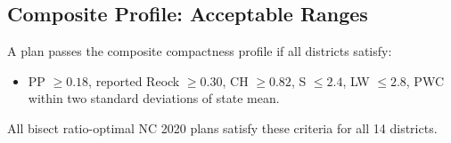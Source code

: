 \subsection{Composite Profile: Acceptable Ranges}

A plan passes the composite compactness profile if all districts satisfy:
\begin{itemize}
  \item PP $\geq 0.18$, reported Reock $\geq 0.30$, CH $\geq 0.82$,
    S $\leq 2.4$, LW $\leq 2.8$, PWC within two standard deviations of state mean.
\end{itemize}
All bisect ratio-optimal NC 2020 plans satisfy these criteria for all 14 districts.
